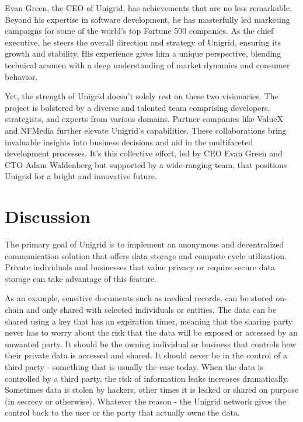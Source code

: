 \documentclass[a4paper,oneside]{article}
\begin{document}
Evan Green, the CEO of Unigrid, has achievements that are no less remarkable. Beyond his expertise in software development, he has masterfully led marketing campaigns for some of the world's top Fortune 500 companies. As the chief executive, he steers the overall direction and strategy of Unigrid, ensuring its growth and stability. His experience gives him a unique perspective, blending technical acumen with a deep understanding of market dynamics and consumer behavior.

Yet, the strength of Unigrid doesn't solely rest on these two visionaries. The project is bolstered by a diverse and talented team comprising developers, strategists, and experts from various domains. Partner companies like ValueX \cite{valuex2023} and NFMedia \cite{nfmedia2023} further elevate Unigrid's capabilities. These collaborations bring invaluable insights into business decisions and aid in the multifaceted development processes. It's this collective effort, led by CEO Evan Green and CTO Adam Waldenberg but supported by a wide-ranging team, that positions Unigrid for a bright and innovative future.


\section{Discussion}
The primary goal of Unigrid is to implement an anonymous and decentralized communication solution that offers data storage and compute cycle utilization. Private individuals and businesses that value privacy or require secure data storage can take advantage of this feature.

As an example, sensitive documents such as medical records, can be stored on-chain and only shared with selected individuals or entities. The data can be shared using a key that has an expiration timer, meaning that the sharing party never has to worry about the risk that the data will be exposed or accessed by an unwanted party. It should be the owning individual or business that controls how their private data is accessed and shared. It should never be in the control of a third party - something that is usually the case today. When the data is controlled by a third party, the risk of information leaks increases dramatically. Sometimes data is stolen by hackers, other times it is leaked or shared on purpose (in secrecy or otherwise). Whatever the reason - the Unigrid network gives the control back to the user or the party that actually owns the data.
\end{document}
